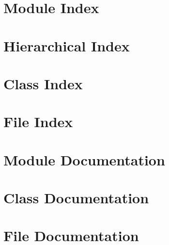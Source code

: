 \documentclass[twoside]{book}
\begin{document}
\chapter{Module Index}

\chapter{Hierarchical Index}

\chapter{Class Index}

\chapter{File Index}

\chapter{Module Documentation}


\chapter{Class Documentation}









\chapter{File Documentation}













































\newpage
{}
{}
\printindex
\end{document}
